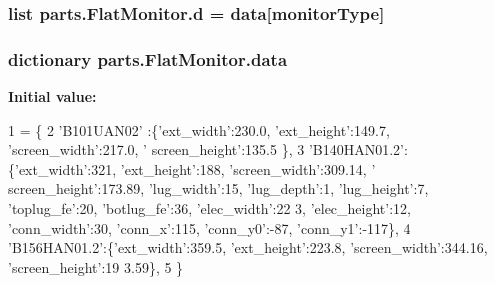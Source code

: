 \subsubsection[{d}]{\setlength{\rightskip}{0pt plus 5cm}list parts.\+Flat\+Monitor.\+d = {\bf data}\mbox{[}monitor\+Type\mbox{]}\hspace{0.3cm}{\ttfamily [static]}}\label{classparts_1_1_flat_monitor_aeb1da09bd78cfac34f42ed8dabe0c386}
\hypertarget{classparts_1_1_flat_monitor_a235b01403ad3bb1c5d95d6cbc08dac96}{}
\subsubsection[{data}]{\setlength{\rightskip}{0pt plus 5cm}dictionary parts.\+Flat\+Monitor.\+data\hspace{0.3cm}{\ttfamily [static]}}\label{classparts_1_1_flat_monitor_a235b01403ad3bb1c5d95d6cbc08dac96}
{\bfseries Initial value\+:}
\begin{DoxyCode}
1 = \{
2                         \textcolor{stringliteral}{'B101UAN02'}  :\{\textcolor{stringliteral}{'ext\_width'}:230.0, \textcolor{stringliteral}{'ext\_height'}:149.7, \textcolor{stringliteral}{'screen\_width'}:217.0,  \textcolor{stringliteral}{'
      screen\_height'}:135.5 \},
3                         \textcolor{stringliteral}{'B140HAN01.2'}:\{\textcolor{stringliteral}{'ext\_width'}:321, \textcolor{stringliteral}{'ext\_height'}:188, \textcolor{stringliteral}{'screen\_width'}:309.14, \textcolor{stringliteral}{'
      screen\_height'}:173.89, \textcolor{stringliteral}{'lug\_width'}:15, \textcolor{stringliteral}{'lug\_depth'}:1, \textcolor{stringliteral}{'lug\_height'}:7, \textcolor{stringliteral}{'toplug\_fe'}:20, \textcolor{stringliteral}{'botlug\_fe'}:36, \textcolor{stringliteral}{'elec\_width'}:22
      3, \textcolor{stringliteral}{'elec\_height'}:12, \textcolor{stringliteral}{'conn\_width'}:30, \textcolor{stringliteral}{'conn\_x'}:115, \textcolor{stringliteral}{'conn\_y0'}:-87, \textcolor{stringliteral}{'conn\_y1'}:-117\},
4             \textcolor{stringliteral}{'B156HAN01.2'}:\{\textcolor{stringliteral}{'ext\_width'}:359.5, \textcolor{stringliteral}{'ext\_height'}:223.8, \textcolor{stringliteral}{'screen\_width'}:344.16, \textcolor{stringliteral}{'screen\_height'}:19
      3.59\},
5                 \}
\end{DoxyCode}
\hypertarget{classparts_1_1_flat_monitor_a7d9c9c12ad6f9aa631e1311fc0d3fa94}{}
